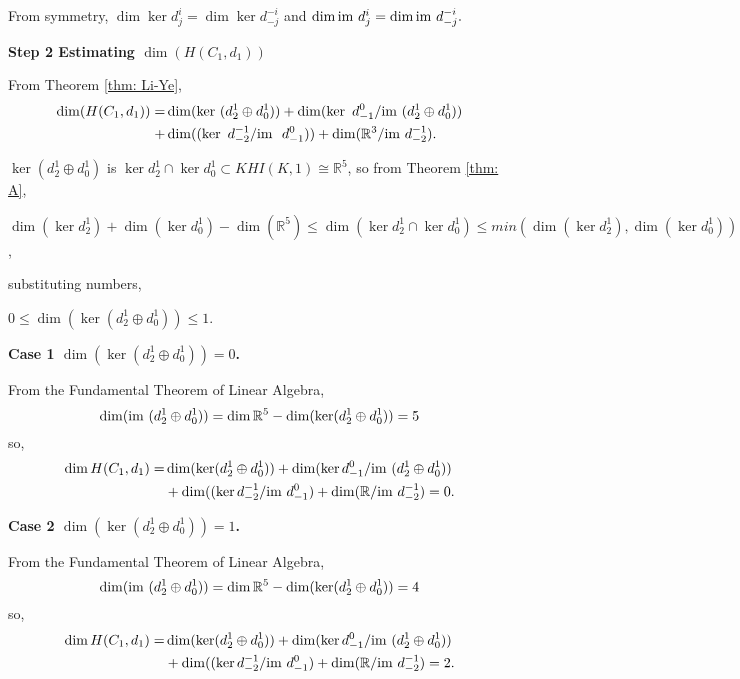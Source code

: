 \documentclass{amsart}
\theoremstyle{definition}
\newcommand{\im}{{\rm im~}}
\begin{document}
From symmetry, $\dim \ker d^i_j= \dim \ker d^{-i}_{-j}$
and $\dim \im d^i_j= \dim \im d^{-i}_{-j}.$

\textbf{Step 2 Estimating $\dim(H(C_1,d_1))$} 

From Theorem \ref{thm: Li-Ye},
\begin{equation}
    \begin{aligned}
       \dim(H(C_1,d_1))=&\dim(\ker~(d^1_2 \oplus d^1_0))+\dim(\ker~d^0_{-1}/\im(d^1_2 \oplus     d^1_0))\\+&\dim((\ker~d^{-1}_{-2}/\im~d^0_{-1}))+
        \dim(\mathbb{R}^3/\im d^{-1}_{-2}). 
    \end{aligned}
\end{equation}


$\ker(d^1_2 \oplus d^1_0)$ is $\ker d^{1}_{2} \cap \ker d^1_0 \subset KHI(K,1)\cong \mathbb{R}^5$, so from Theorem \ref{thm: A}, 

\begin{center}
${\dim(\ker d^{1}_{2}) + \dim(\ker d^1_0) - \dim (\mathbb{R}^5) }
\leq
{\dim(\ker d^{1}_{2} \cap \ker d^1_0)}
\leq
{min (\dim(\ker d^{1}_{2}),\dim (\ker d^1_0))}$,
\end{center}

substituting numbers,
 
 \begin{center}
     $0\leq\dim(\ker (d^1_2 \oplus d^1_0))\leq1$.
 \end{center}

\bigskip

\textbf{Case 1 $\dim(\ker (d^1_2 \oplus d^1_0))=0$.}

From the Fundamental Theorem of Linear Algebra,
$$\dim(\im(d^1_2 \oplus d^1_0))= \dim \mathbb{R}^5-\dim(\ker (d^1_2 \oplus d^1_0))= 5$$
so,
\begin{equation*}
    \begin{aligned}
         \dim H(C_1,d_1) = 
         &\dim(\ker (d^1_2 \oplus d^1_0))
         +
         \dim(\ker d^0_{-1}/\im(d^1_2 \oplus d^1_0))\\
         &+
         \dim((\ker d^{-1}_{-2}/\im d^0_{-1})
         +
         \dim(\mathbb{R}/\im d^{-1}_{-2})=0.
    \end{aligned}
\end{equation*}

\textbf{Case 2 $\dim(\ker (d^1_2 \oplus d^1_0))=1$.}

From the Fundamental Theorem of Linear Algebra,
$$\dim(\im (d^1_2 \oplus d^1_0))= \dim \mathbb{R}^5-\dim(\ker (d^1_2 \oplus d^1_0))= 4$$
so,
\begin{equation*}
    \begin{aligned}
         \dim H(C_1,d_1) = 
         &\dim(\ker (d^1_2 \oplus d^1_0))
         +
         \dim(\ker d^0_{-1}/\im(d^1_2 \oplus d^1_0))\\
         &+
         \dim((\ker d^{-1}_{-2}/\im d^0_{-1})
         +
         \dim(\mathbb{R}/\im d^{-1}_{-2})=2.
    \end{aligned}
\end{equation*}
\end{document}
